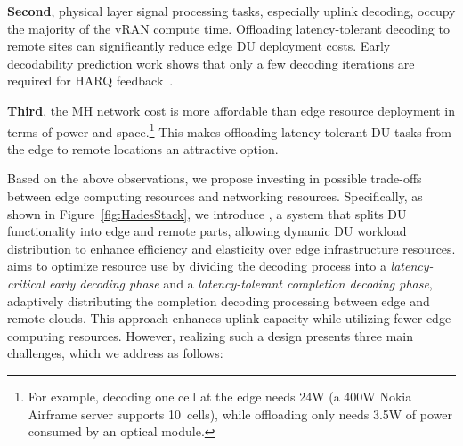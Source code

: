 \noindent\textbf{Second}, 
physical layer signal processing tasks, especially uplink decoding, occupy the majority of the vRAN compute time. Offloading latency-tolerant decoding to remote sites can significantly reduce edge DU deployment costs. Early decodability prediction work shows that only a few decoding iterations are required for HARQ feedback~\cite{EHARQ,FastHarqURLLC}.



\noindent\textbf{Third}, 
the MH network cost is more affordable than edge resource deployment in terms of power and space.\footnote{For example, decoding one cell at the edge needs 24W (a 400W Nokia Airframe server supports 10~cells), while offloading only needs 3.5W of power consumed by an optical module.}
This makes offloading latency-tolerant DU tasks from the edge to remote locations an attractive option.


Based on the above observations, 
we propose investing in possible trade-offs between edge computing resources and networking resources. Specifically, as shown in Figure~\ref{fig:HadesStack}, we introduce \Name{}, a system that splits DU functionality into edge and remote parts, allowing dynamic DU workload distribution to enhance efficiency and elasticity over edge infrastructure resources. \Name{} aims to optimize resource use by dividing the decoding process into a \textit{latency-critical early decoding phase} and a \textit{latency-tolerant completion decoding phase}, adaptively distributing the completion decoding processing between edge and remote clouds. 
This approach enhances uplink capacity while utilizing fewer edge computing resources. However, realizing such a design presents three main challenges, which we address as follows:





